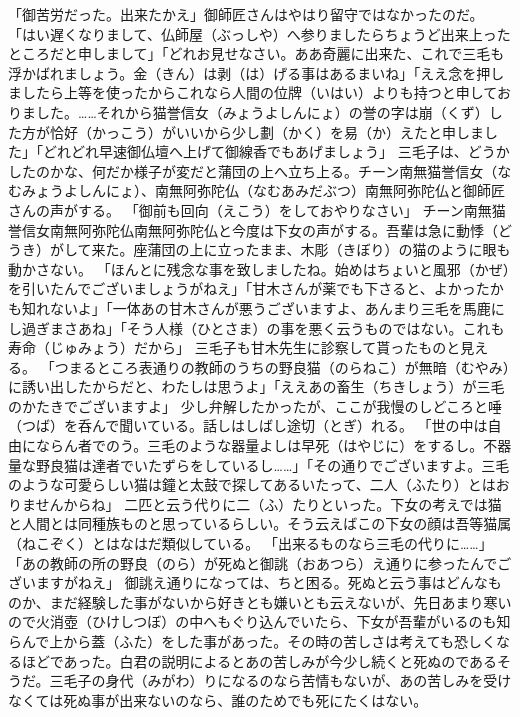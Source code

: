 \documentclass{book}
\begin{document}
「御苦労だった。出来たかえ」御師匠さんはやはり留守ではなかったのだ。
「はい遅くなりまして、仏師屋（ぶっしや）へ参りましたらちょうど出来上ったところだと申しまして」「どれお見せなさい。ああ奇麗に出来た、これで三毛も浮かばれましょう。金（きん）は剥（は）げる事はあるまいね」「ええ念を押しましたら上等を使ったからこれなら人間の位牌（いはい）よりも持つと申しておりました。\ldots{}\ldots{}それから猫誉信女（みょうよしんにょ）の誉の字は崩（くず）した方が恰好（かっこう）がいいから少し劃（かく）を易（か）えたと申しました」「どれどれ早速御仏壇へ上げて御線香でもあげましょう」
三毛子は、どうかしたのかな、何だか様子が変だと蒲団の上へ立ち上る。チーン南無猫誉信女（なむみょうよしんにょ）、南無阿弥陀仏（なむあみだぶつ）南無阿弥陀仏と御師匠さんの声がする。
「御前も回向（えこう）をしておやりなさい」
チーン南無猫誉信女南無阿弥陀仏南無阿弥陀仏と今度は下女の声がする。吾輩は急に動悸（どうき）がして来た。座蒲団の上に立ったまま、木彫（きぼり）の猫のように眼も動かさない。
「ほんとに残念な事を致しましたね。始めはちょいと風邪（かぜ）を引いたんでございましょうがねえ」「甘木さんが薬でも下さると、よかったかも知れないよ」「一体あの甘木さんが悪うございますよ、あんまり三毛を馬鹿にし過ぎまさあね」「そう人様（ひとさま）の事を悪く云うものではない。これも寿命（じゅみょう）だから」
三毛子も甘木先生に診察して貰ったものと見える。
「つまるところ表通りの教師のうちの野良猫（のらねこ）が無暗（むやみ）に誘い出したからだと、わたしは思うよ」「ええあの畜生（ちきしょう）が三毛のかたきでございますよ」
少し弁解したかったが、ここが我慢のしどころと唾（つば）を呑んで聞いている。話しはしばし途切（とぎ）れる。
「世の中は自由にならん者でのう。三毛のような器量よしは早死（はやじに）をするし。不器量な野良猫は達者でいたずらをしているし\ldots{}\ldots{}」「その通りでございますよ。三毛のような可愛らしい猫は鐘と太鼓で探してあるいたって、二人（ふたり）とはおりませんからね」
二匹と云う代りに二（ふ）たりといった。下女の考えでは猫と人間とは同種族ものと思っているらしい。そう云えばこの下女の顔は吾等猫属（ねこぞく）とはなはだ類似している。
「出来るものなら三毛の代りに\ldots{}\ldots{}」「あの教師の所の野良（のら）が死ぬと御誂（おあつら）え通りに参ったんでございますがねえ」
御誂え通りになっては、ちと困る。死ぬと云う事はどんなものか、まだ経験した事がないから好きとも嫌いとも云えないが、先日あまり寒いので火消壺（ひけしつぼ）の中へもぐり込んでいたら、下女が吾輩がいるのも知らんで上から蓋（ふた）をした事があった。その時の苦しさは考えても恐しくなるほどであった。白君の説明によるとあの苦しみが今少し続くと死ぬのであるそうだ。三毛子の身代（みがわ）りになるのなら苦情もないが、あの苦しみを受けなくては死ぬ事が出来ないのなら、誰のためでも死にたくはない。
\end{document}
